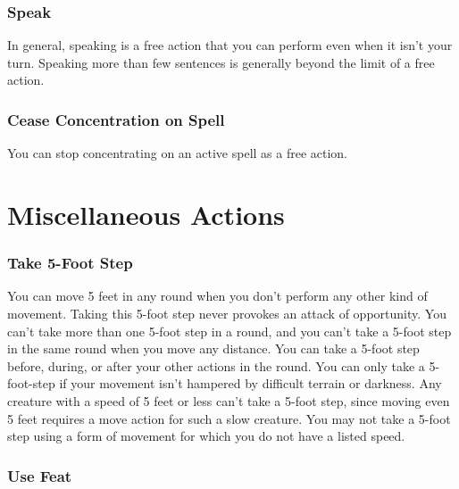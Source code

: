 \subsubsection{Speak}

In general, speaking is a free action that you can perform even when it isn't your turn. Speaking more than few sentences is generally beyond the limit of a free action.

\subsubsection{Cease Concentration on Spell}

You can stop concentrating on an active spell as a free action.


\section{Miscellaneous Actions}

\subsubsection{Take 5-Foot Step}

You can move 5 feet in any round when you don't perform any other kind of movement. Taking this 5-foot step never provokes an attack of opportunity. You can't take more than one 5-foot step in a round, and you can't take a 5-foot step in the same round when you move any distance. You can take a 5-foot step before, during, or after your other actions in the round.  You can only take a 5-foot-step if your movement isn't hampered by difficult terrain or darkness. Any creature with a speed of 5 feet or less can't take a 5-foot step, since moving even 5 feet requires a move action for such a slow creature. You may not take a 5-foot step using a form of movement for which you do not have a listed speed. 

\subsubsection{Use Feat}

